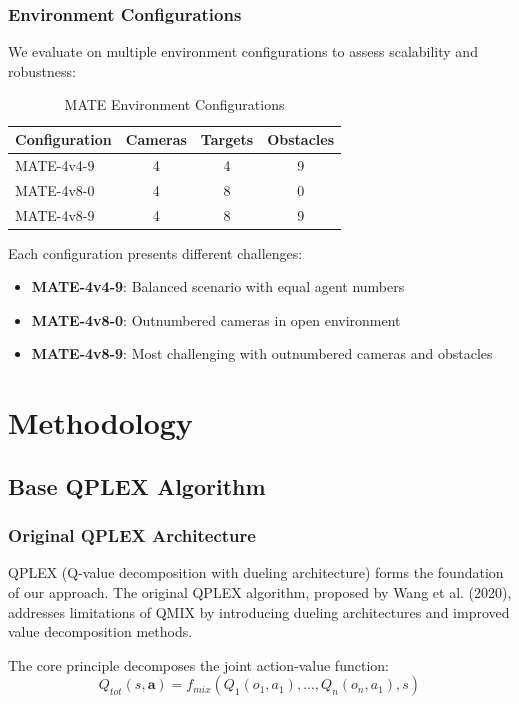 \documentclass[12pt,a4paper]{report}
\begin{document}
\subsection{Environment Configurations}
We evaluate on multiple environment configurations to assess scalability and robustness:

\begin{table}[H]
\centering
\caption{MATE Environment Configurations}
\begin{tabular}{lccc}
\toprule
Configuration & Cameras & Targets & Obstacles \\
\midrule
MATE-4v4-9 & 4 & 4 & 9 \\
MATE-4v8-0 & 4 & 8 & 0 \\
MATE-4v8-9 & 4 & 8 & 9 \\
\bottomrule
\end{tabular}
\end{table}

Each configuration presents different challenges:
\begin{itemize}
\item \textbf{MATE-4v4-9}: Balanced scenario with equal agent numbers
\item \textbf{MATE-4v8-0}: Outnumbered cameras in open environment
\item \textbf{MATE-4v8-9}: Most challenging with outnumbered cameras and obstacles
\end{itemize}

\chapter{Methodology}

\section{Base QPLEX Algorithm}

\subsection{Original QPLEX Architecture}
QPLEX (Q-value decomposition with dueling architecture) forms the foundation of our approach. The original QPLEX algorithm, proposed by Wang et al. (2020), addresses limitations of QMIX by introducing dueling architectures and improved value decomposition methods.

The core principle decomposes the joint action-value function:
$$Q_{tot}(s, \mathbf{a}) = f_{mix}(Q_1(o_1, a_1), ..., Q_n(o_n, a_1), s)$$
\end{document}
